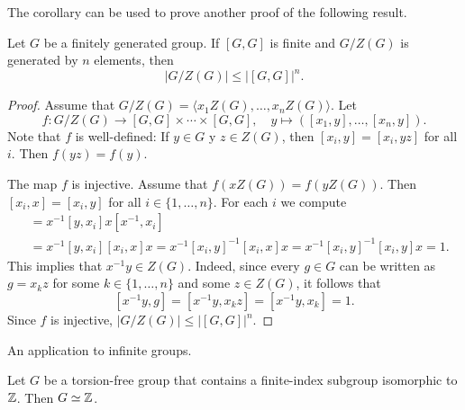 
The corollary can be used to prove another proof of
the following result. 

\begin{theorem}
	Let $G$ be a finitely generated group. If $[G,G]$ is finite and $G/Z(G)$ is generated by
	$n$ elements, then  
	\[
	|G/Z(G)|\leq |[G,G]|^n. 
	\]
\end{theorem}

\begin{proof}
	Assume that $G/Z(G)=\langle x_1Z(G),\dots,x_nZ(G)\rangle$. Let 
	\[
		f\colon G/Z(G)\to [G,G]\times\cdots\times [G,G],
		\quad
		y\mapsto ([x_1,y],\dots,[x_n,y]).
	\]
	Note that $f$ is well-defined: If $y\in G$ y $z\in Z(G)$, then $[x_i,y]=[x_i,yz]$ for all $i$. 
	Then $f(yz)=f(y)$.
	 
	The map $f$ is injective. Assume that $f(xZ(G))=f(yZ(G))$. Then 
	$[x_i,x]=[x_i,y]$ for all $i\in\{1,\dots,n\}$. For each $i$ we compute  
	\begin{align*}
		[x^{-1}y,x_i] &= x^{-1}[y,x_i]x[x^{-1},x_i]\\
		&=x^{-1}[y,x_i][x_i,x]x=x^{-1}[x_i,y]^{-1}[x_i,x]x=x^{-1}[x_i,y]^{-1}[x_i,y]x=1.
	\end{align*}
	This implies that $x^{-1}y\in Z(G)$. Indeed, since  
	every $g\in G$ can be written as $g=x_kz$ for some $k\in\{1,\dots,n\}$ and some $z\in Z(G)$, 
	it follows that 
    \[
    [x^{-1}y,g]=[x^{-1}y,x_kz]=[x^{-1}y,x_k]=1.
    \]
    Since $f$ is injective, 
	$|G/Z(G)|\leq |[G,G]|^n$. 
\end{proof}

An application to infinite groups. 

\begin{theorem}
	Let $G$ be a torsion-free group that contains a finite-index subgroup isomorphic to  
	$\mathbb{Z}$. Then $G\simeq\mathbb{Z}$.
\end{theorem}

